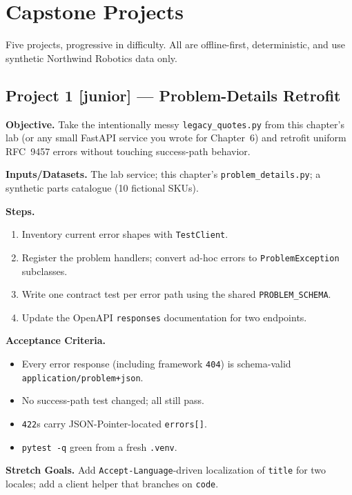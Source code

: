 \section{Capstone Projects}

Five projects, progressive in difficulty. All are offline-first,
deterministic, and use synthetic Northwind Robotics data only.

\subsection{Project 1 [junior] --- Problem-Details Retrofit}

\textbf{Objective.} Take the intentionally messy \texttt{legacy\_quotes.py}
from this chapter's lab (or any small FastAPI service you wrote for
Chapter~6) and retrofit uniform RFC~9457 errors without touching
success-path behavior.

\textbf{Inputs/Datasets.} The lab service; this chapter's
\texttt{problem\_details.py}; a synthetic parts catalogue (10 fictional
SKUs).

\textbf{Steps.}
\begin{enumerate}
  \item Inventory current error shapes with \texttt{TestClient}.
  \item Register the problem handlers; convert ad-hoc errors to
        \texttt{ProblemException} subclasses.
  \item Write one contract test per error path using the shared
        \texttt{PROBLEM\_SCHEMA}.
  \item Update the OpenAPI \texttt{responses} documentation for two
        endpoints.
\end{enumerate}

\textbf{Acceptance Criteria.}
\begin{itemize}
  \item[$\square$] Every error response (including framework \texttt{404})
        is schema-valid \texttt{application/problem+json}.
  \item[$\square$] No success-path test changed; all still pass.
  \item[$\square$] \texttt{422}s carry JSON-Pointer-located
        \texttt{errors[]}.
  \item[$\square$] \texttt{pytest -q} green from a fresh \texttt{.venv}.
\end{itemize}

\textbf{Stretch Goals.} Add \texttt{Accept-Language}-driven localization of
\texttt{title} for two locales; add a client helper that branches on
\texttt{code}.

